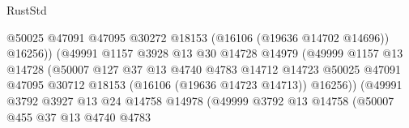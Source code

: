 \begin{lexlean}{RustStd}
\begin{coremodule}
                                            @50025
                                            @47091
                                            @47095
                                            @30272
                                            @18153
                                            (@16106 (@19636 @14702 @14696))
                                            @16256))
                                        (@49991
                                          @1157
                                          @3928
                                          @13
                                          @30
                                          @14728
                                          @14979
                                          (@49999
                                            @1157
                                            @13
                                            @14728
                                            (@50007
                                              @127
                                              @37
                                              @13
                                              @4740
                                              @4783
                                              @14712
                                              @14723
                                              @50025
                                              @47091
                                              @47095
                                              @30712
                                              @18153
                                              (@16106 (@19636 @14723 @14713))
                                              @16256))
                                          (@49991
                                            @3792
                                            @3927
                                            @13
                                            @24
                                            @14758
                                            @14978
                                            (@49999
                                              @3792
                                              @13
                                              @14758
                                              (@50007
                                                @455
                                                @37
                                                @13
                                                @4740
                                                @4783

\end{coremodule}
\end{lexlean}
